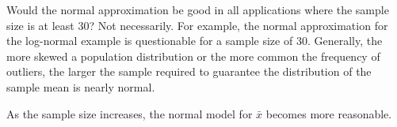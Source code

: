 \begin{example}{Would the normal approximation be good in all applications where the sample size is at least 30?}
Not necessarily. For example, the normal approximation for the log-normal example is questionable for a sample size of 30. Generally, the more skewed a population distribution or the more common the frequency of outliers, the larger the sample required to guarantee the distribution of the sample mean is nearly normal.
\end{example}

\begin{tipBox}{
As the sample size increases, the normal model for $\bar{x}$ becomes more reasonable. 
}
\end{tipBox}



